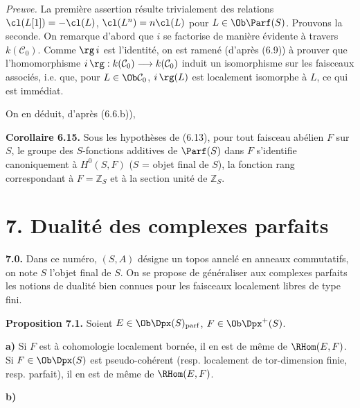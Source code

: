 \emph{Preuve.} La première assertion résulte trivialement des relations \(\cl(L[1])=-\cl(L)\), \(\cl(L^n)=n\cl(L)\) pour \(L\in\Ob\Parf(S)\). Prouvons la seconde. On remarque d'abord que \(i\) se factorise de manière évidente à travers \(k(\mathcal C_0)\). Comme \(\rg\, i\) est l'identité, on est ramené (d'après (6.9)) à prouver que l'homomorphisme \(i\, \rg:k(\mathcal C_0)\longrightarrow k(\mathcal C_0)\) induit un isomorphisme sur les faisceaux associés, i.e. que, pour \(L\in\Ob\mathcal C_0\), \(i\, \rg(L)\) est localement isomorphe à \(L\), ce qui est immédiat.

On en déduit, d'après (6.6.b)),

\textbf{Corollaire 6.15.} Sous les hypothèses de (6.13), pour tout faisceau abélien \(F\) sur \(S\), le groupe des \(S\)-fonctions additives de \(\Parf(S)\) dans \(F\) s'identifie canoniquement à \(H^0(S,F)\) (\(S\) = objet final de \(S\)), la fonction rang correspondant à \(F=\mathbb Z_S\) et à la section unité de \(\mathbb Z_S\).

\section*{7. Dualité des complexes parfaits}

\textbf{7.0.} Dans ce numéro, \((S,A)\) désigne un topos annelé en anneaux commutatifs, on note \(S\) l'objet final de \(S\). On se propose de généraliser aux complexes parfaits les notions de dualité bien connues pour les faisceaux localement libres de type fini.

\textbf{Proposition 7.1.} Soient \(E\in\Ob\Dpx(S)_{\mathrm{parf}}\), \(F\in\Ob\Dpx^+(S)\).

\textbf{a)} Si \(F\) est à cohomologie localement bornée, il en est de même de \(\RHom(E,F)\). Si \(F\in\Ob\Dpx(S)\) est pseudo-cohérent (resp. localement de tor-dimension finie, resp. parfait), il en est de même de \(\RHom(E,F)\).

\textbf{b)}
